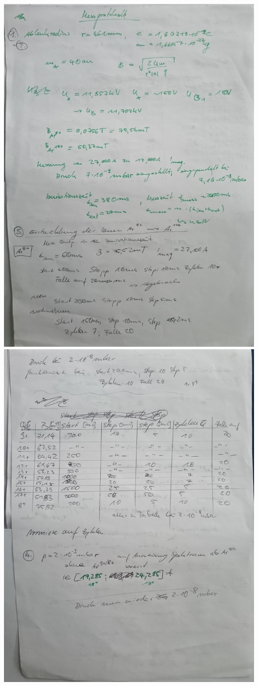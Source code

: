     \includegraphics[scale=0.28]{../Mitschriften/DSC_0096.JPG}\\ \newpage
    \includegraphics[scale=0.28]{../Mitschriften/DSC_0097.JPG}